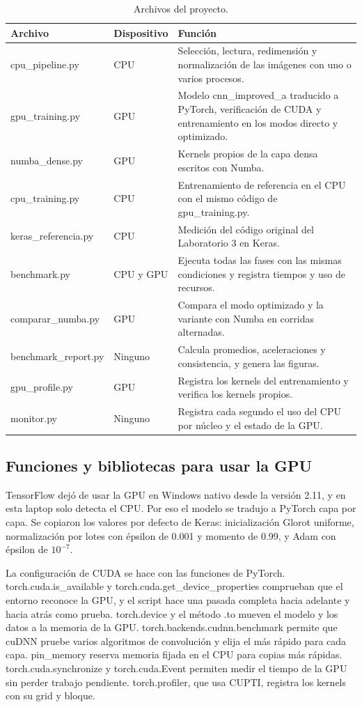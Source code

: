\documentclass[11pt,letterpaper]{article}
\begin{document}
\begin{table}[H]
\centering
\small
\caption{Archivos del proyecto.}
\label{tab:codigo}
\begin{tabular}{L{4.2cm}L{2.2cm}L{9cm}}
\toprule
Archivo & Dispositivo & Función \\
\midrule
cpu\_pipeline.py & CPU & Selección, lectura, redimensión y normalización de las imágenes con uno o varios procesos. \\
gpu\_training.py & GPU & Modelo cnn\_improved\_a traducido a PyTorch, verificación de CUDA y entrenamiento en los modos directo y optimizado. \\
numba\_dense.py & GPU & Kernels propios de la capa densa escritos con Numba. \\
cpu\_training.py & CPU & Entrenamiento de referencia en el CPU con el mismo código de gpu\_training.py. \\
keras\_referencia.py & CPU & Medición del código original del Laboratorio 3 en Keras. \\
benchmark.py & CPU y GPU & Ejecuta todas las fases con las mismas condiciones y registra tiempos y uso de recursos. \\
comparar\_numba.py & GPU & Compara el modo optimizado y la variante con Numba en corridas alternadas. \\
benchmark\_report.py & Ninguno & Calcula promedios, aceleraciones y consistencia, y genera las figuras. \\
gpu\_profile.py & GPU & Registra los kernels del entrenamiento y verifica los kernels propios. \\
monitor.py & Ninguno & Registra cada segundo el uso del CPU por núcleo y el estado de la GPU. \\
\bottomrule
\end{tabular}
\end{table}

\subsection{Funciones y bibliotecas para usar la GPU}
TensorFlow dejó de usar la GPU en Windows nativo desde la versión 2.11, y en esta laptop solo detecta el CPU. Por eso el modelo se tradujo a PyTorch capa por capa. Se copiaron los valores por defecto de Keras: inicialización Glorot uniforme, normalización por lotes con épsilon de 0.001 y momento de 0.99, y Adam con épsilon de $10^{-7}$.

La configuración de CUDA se hace con las funciones de PyTorch. torch.cuda.is\_available y torch.cuda.get\_device\_properties comprueban que el entorno reconoce la GPU, y el script hace una pasada completa hacia adelante y hacia atrás como prueba. torch.device y el método .to mueven el modelo y los datos a la memoria de la GPU. torch.backends.cudnn.benchmark permite que cuDNN pruebe varios algoritmos de convolución y elija el más rápido para cada capa. pin\_memory reserva memoria fijada en el CPU para copias más rápidas. torch.cuda.synchronize y torch.cuda.Event permiten medir el tiempo de la GPU sin perder trabajo pendiente. torch.profiler, que usa CUPTI, registra los kernels con su grid y bloque.
\end{document}

